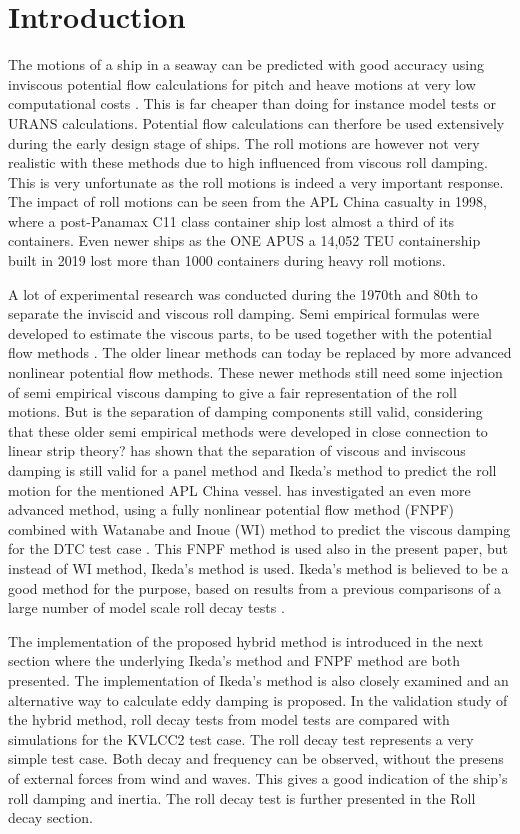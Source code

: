 \section{Introduction}\label{introduction}

The motions of a ship in a seaway can be predicted with good accuracy
using inviscous potential flow calculations for pitch and heave motions
at very low computational costs \cite{7505983/FB64RGPF}. This is far
cheaper than doing for instance model tests or URANS calculations.
Potential flow calculations can therfore be used extensively during the
early design stage of ships. The roll motions are however not very
realistic with these methods due to high influenced from viscous roll
damping. This is very unfortunate as the roll motions is indeed a very
important response. The impact of roll motions can be seen from the APL
China casualty in 1998, where a post-Panamax C11 class container ship
lost almost a third of its containers. Even newer ships as the ONE APUS
a 14,052 TEU containership built in 2019 lost more than 1000 containers
during heavy roll motions.

A lot of experimental research was conducted during the 1970th and 80th
to separate the inviscid and viscous roll damping. Semi empirical
formulas were developed to estimate the viscous parts, to be used
together with the potential flow methods \cite{7505983/937PN5DT}. The
older linear methods can today be replaced by more advanced nonlinear
potential flow methods. These newer methods still need some injection of
semi empirical viscous damping to give a fair representation of the roll
motions. But is the separation of damping components still valid,
considering that these older semi empirical methods were developed in
close connection to linear strip theory? \cite{7505983/UGK6YEVD} has
shown that the separation of viscous and inviscous damping is still
valid for a panel method and Ikeda's method to predict the roll motion
for the mentioned APL China vessel. \cite{7505983/24TNAV5Z} has
investigated an even more advanced method, using a fully nonlinear
potential flow method (FNPF) combined with Watanabe and Inoue (WI)
method to predict the viscous damping for the DTC test case
\cite{7505983/BYNJ8CFG}. This FNPF method is used also in the present
paper, but instead of WI method, Ikeda's method is used. Ikeda's method
is believed to be a good method for the purpose, based on results from a
previous comparisons of a large number of model scale roll decay tests
\cite{7505983/QMGQ76Q9}.

The implementation of the proposed hybrid method is introduced in the
next section where the underlying Ikeda's method and FNPF method are
both presented. The implementation of Ikeda's method is also closely
examined and an alternative way to calculate eddy damping is proposed.
In the validation study of the hybrid method, roll decay tests from
model tests are compared with simulations for the KVLCC2 test case. The
roll decay test represents a very simple test case. Both decay and
frequency can be observed, without the presens of external forces from
wind and waves. This gives a good indication of the ship's roll damping
and inertia. The roll decay test is further presented in the Roll decay
section.

    